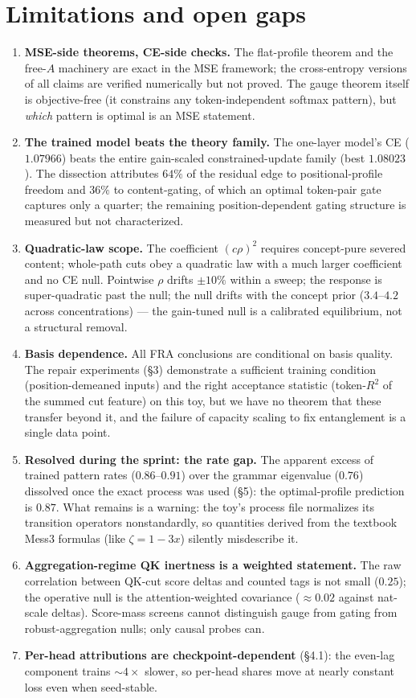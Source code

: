 \documentclass{article}
\theoremstyle{definition}
\begin{document}
\section{Limitations and open gaps}

\begin{enumerate}
\item \textbf{MSE-side theorems, CE-side checks.} The flat-profile theorem
and the free-$A$ machinery are exact in the MSE framework; the
cross-entropy versions of all claims are verified numerically but not
proved. The gauge theorem itself is objective-free (it constrains any
token-independent softmax pattern), but \emph{which} pattern is optimal is
an MSE statement.
\item \textbf{The trained model beats the theory family.} The one-layer
model's CE ($1.07966$) beats the entire gain-scaled constrained-update
family (best $1.08023$). The dissection attributes $64\%$ of the residual
edge to positional-profile freedom and $36\%$ to content-gating, of which
an optimal token-pair gate captures only a quarter; the remaining
position-dependent gating structure is measured but not characterized.
\item \textbf{Quadratic-law scope.} The coefficient $(c\rho)^2$ requires
concept-pure severed content; whole-path cuts obey a quadratic law with a
much larger coefficient and no CE null. Pointwise $\rho$ drifts $\pm 10\%$
within a sweep; the response is super-quadratic past the null; the null
drifts with the concept prior ($3.4$--$4.2$ across concentrations) --- the
gain-tuned null is a calibrated equilibrium, not a structural removal.
\item \textbf{Basis dependence.} All FRA conclusions are conditional on
basis quality. The repair experiments (\S 3) demonstrate a sufficient
training condition (position-demeaned inputs) and the right acceptance
statistic (token-$R^2$ of the summed cut feature) on this toy, but we have
no theorem that these transfer beyond it, and the failure of capacity
scaling to fix entanglement is a single data point.
\item \textbf{Resolved during the sprint: the rate gap.} The apparent
excess of trained pattern rates ($0.86$--$0.91$) over the grammar
eigenvalue ($0.76$) dissolved once the exact process was used (\S 5): the
optimal-profile prediction is $0.87$. What remains is a warning:
the toy's process file normalizes its transition operators nonstandardly,
so quantities derived from the textbook Mess3 formulas (like
$\zeta = 1-3x$) silently misdescribe it.
\item \textbf{Aggregation-regime QK inertness is a weighted statement.}
The raw correlation between QK-cut score deltas and counted tags is not
small ($0.25$); the operative null is the attention-weighted covariance
($\approx 0.02$ against nat-scale deltas). Score-mass screens cannot
distinguish gauge from gating from robust-aggregation nulls; only causal
probes can.
\item \textbf{Per-head attributions are checkpoint-dependent} (\S 4.1):
the even-lag component trains $\sim4\times$ slower, so per-head shares move
at nearly constant loss even when seed-stable.
\end{enumerate}
\end{document}
